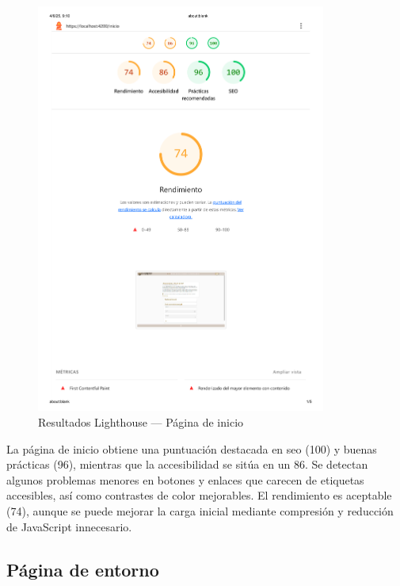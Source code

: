 \begin{figure}[h!tb]
  \centering
  \includegraphics[width=0.85\textwidth]{figs/inicio_lighthouse.png}
  \caption{Resultados Lighthouse — Página de inicio}
  \label{fig:lighthouse-inicio}
\end{figure}

La página de inicio obtiene una puntuación destacada en \gls{seo} (100) y buenas prácticas (96), mientras que la accesibilidad se sitúa en un 86. Se detectan algunos problemas menores en botones y enlaces que carecen de etiquetas accesibles, así como contrastes de color mejorables. El rendimiento es aceptable (74), aunque se puede mejorar la carga inicial mediante compresión y reducción de JavaScript innecesario.

\subsection*{Página de entorno}

